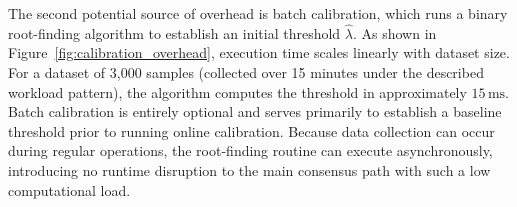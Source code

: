 The second potential source of overhead is batch calibration, which runs a binary root-finding algorithm to establish an initial threshold $\widehat{\lambda}$. As shown in Figure~\ref{fig:calibration_overhead}, execution time scales linearly with dataset size. For a dataset of 3,000 samples (collected over 15 minutes under the described workload pattern), the algorithm computes the threshold in approximately $15\,\text{ms}$. Batch calibration is entirely optional and serves primarily to establish a baseline threshold prior to running online calibration. Because data collection can occur during regular operations, the root-finding routine can execute asynchronously, introducing no runtime disruption to the main consensus path with such a low computational load.